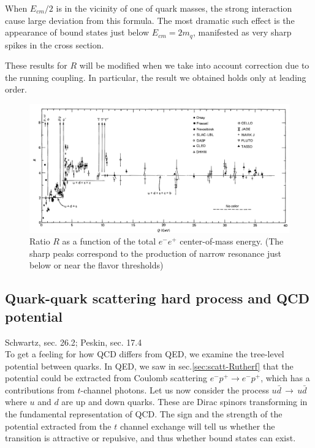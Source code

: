 \documentclass[TheoreticalPhy_ModB.tex]{subfiles}
\begin{document}
When $E_{cm}/2$ is in the vicinity of one of quark masses, the strong interaction cause large deviation from this formula. The most dramatic such effect is the appearance of bound states just below $E_{cm}=2m_q$, manifested as very sharp spikes in the cross section.

These results for $R$ will be modified when we take into account correction due to the running coupling. In particular, the result we obtained holds only at leading order. 

\begin{figure}[H]
\centering
\includegraphics[width=15.5cm]{img/electr-quark-scatt.jpg}
\caption{Ratio $R$ as a function of the total $e^-e^+$ center-of-mass energy. (The sharp peaks correspond to the production of narrow resonance just below or near the flavor thresholds)}
\label{fig:elect-quark-scatt}
\end{figure}

\subsection{Quark-quark scattering hard process and QCD potential}

\textsf{Schwartz, sec. 26.2; Peskin, sec. 17.4}\\

To get a feeling for how QCD differs from QED, we examine the tree-level potential between quarks. In QED, we saw in sec.\ref{sec:scatt-Rutherf} that the potential could be extracted from Coulomb scattering $e^-p^+\rightarrow e^-p^+$, which has a contributions from $t$-channel photons. Let us now consider the process $u\bar d\,\rightarrow\,u\bar d$ where $u$ and $d$ are up and down quarks. These are Dirac spinors transforming in the fundamental representation of QCD. The sign and the strength of the potential extracted from the $t$ channel exchange will tell us whether the transition is attractive or repulsive, and thus whether bound states can exist. 
\end{document}
